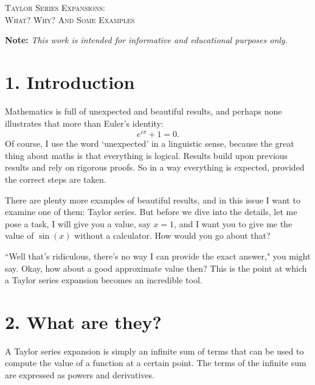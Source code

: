 \documentclass[11pt]{article}
\begin{document}

\begin{tcolorbox}
\begin{center}
    \large
    \textsc{Taylor Series Expansions: \\ What? Why? And Some Examples}
\end{center}
\end{tcolorbox}

\begin{center}
\textbf{Note:} \textit{This work is intended for informative and educational purposes only.}
\end{center}

\section*{1. Introduction}
Mathematics is full of unexpected and beautiful results, and perhaps none illustrates that more than Euler's identity:
\begin{equation*}
    e^{i \pi} + 1 = 0.
\end{equation*}
Of course, I use the word `unexpected' in a linguistic sense, because the great thing about maths is that everything is logical. Results build upon previous results and rely on rigorous proofs. So in a way everything is expected, provided the correct steps are taken.

There are plenty more examples of beautiful results, and in this issue I want to examine one of them: Taylor series. But before we dive into the details, let me pose a task, I will give you a value, say $x = 1$, and I want you to give me the value of $\sin (x)$ without a calculator. How would you go about that? 

``Well that's ridiculous, there's no way I can provide the exact answer," you might say. Okay, how about a good approximate value then? This is the point at which a Taylor series expansion becomes an incredible tool.

\section*{2. What are they?}
A Taylor series expansion is simply an infinite sum of terms that can be used to compute the value of a function at a certain point. The terms of the infinite sum are expressed as powers and derivatives. 
\end{document}
